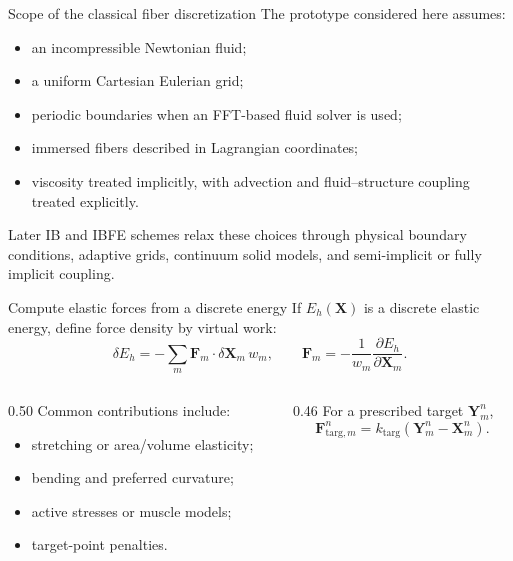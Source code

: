 \documentclass[aspectratio=169,11pt]{beamer}
\newcommand{\Xvec}{\bm{X}}
\newcommand{\Fvec}{\bm{F}}
\begin{document}
\begin{frame}{Scope of the classical fiber discretization}
\small
The prototype considered here assumes:
\begin{itemize}\itemsep5pt
  \item an incompressible Newtonian fluid;
  \item a uniform Cartesian Eulerian grid;
  \item periodic boundaries when an FFT-based fluid solver is used;
  \item immersed fibers described in Lagrangian coordinates;
  \item viscosity treated implicitly, with advection and fluid--structure coupling treated explicitly.
\end{itemize}
\begin{punchbox}
Later IB and IBFE schemes relax these choices through physical boundary conditions, adaptive grids, continuum solid models, and semi-implicit or fully implicit coupling.
\end{punchbox}
\end{frame}

\begin{frame}{Compute elastic forces from a discrete energy}
If $E_h(\Xvec)$ is a discrete elastic energy, define force density by virtual work:
\[
  \delta E_h
  =-\sum_m \Fvec_m\cdot\delta\Xvec_m\,w_m,
  \qquad
  \Fvec_m=-\frac{1}{w_m}\frac{\partial E_h}{\partial\Xvec_m}.
\]
\begin{columns}[T,onlytextwidth]
\begin{column}{0.50\textwidth}
Common contributions include:
\begin{itemize}\itemsep4pt
  \item stretching or area/volume elasticity;
  \item bending and preferred curvature;
  \item active stresses or muscle models;
  \item target-point penalties.
\end{itemize}
\end{column}
\begin{column}{0.46\textwidth}
For a prescribed target $\bm{Y}_m^n$,
\[
  \Fvec_{\mathrm{targ},m}^n
  =k_{\mathrm{targ}}(\bm{Y}_m^n-\Xvec_m^n).
\]
\end{column}
\end{columns}
\end{frame}
\end{document}
